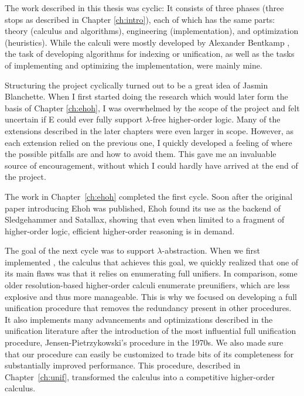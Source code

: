 The work described in this thesis
was cyclic: It consists of three phases (three stops as described in
Chapter \ref{ch:intro}), each of which has the same parts: theory (calculus and
algorithms), engineering (implementation), and optimization (heuristics). While
the calculi were mostly developed by Alexander Bentkamp
\cite{bbcw-21-lfho,bbtvw-21-sup-lam,bbtv-21-full-ho-sup}, the task of developing
algorithms for indexing or unification, as well as the tasks of implementing and
optimizing the implementation, were mainly mine.

Structuring the project cyclically turned out to be a great idea of Jasmin
Blanchette. When I first started doing the research which would later form the
basis of Chapter \ref{ch:ehoh}, I was overwhelmed by the scope of the project
and felt uncertain if E could ever fully support $\lambda$-free higher-order
logic. Many of the extensions described in the later chapters were even larger
in scope. However, as each extension relied on the previous one, I quickly
developed a feeling of where the possible pitfalls are and how to avoid them.
This gave me an invaluable source of encouragement, without which I could hardly have
arrived at the end of the project.

The work in Chapter~\ref{ch:ehoh} completed the first cycle. Soon after the
original paper introducing Ehoh \cite{vbss-19-ehoh1} was published, Ehoh found
its use as the backend of Sledgehammer and Satallax, showing that even when
limited to a fragment of higher-order logic, efficient higher-order reasoning is
in demand.

The goal of the next cycle was to support $\lambda$-abstraction. When we first
implemented \lsup{}, the calculus that achieves this goal, we quickly realized
that one of its main flaws was that it relies on enumerating full unifiers. In
comparison, some older resolution-based higher-order calculi enumerate
preunifiers, which are less explosive and thus more manageable. This is why we
focused on developing a full unification procedure that removes the redundancy
present in other procedures. It also implements many advancements and
optimizations described in the unification literature after the introduction of
the most influential full unification procedure, Jensen-Pietrzykowski's
procedure in the 1970s. We also made sure that our procedure can easily be
customized to trade bits of its completeness for substantially improved
performance. This procedure, described in Chapter~\ref{ch:unif}, transformed the
\lsup{} calculus into a competitive higher-order calculus.

